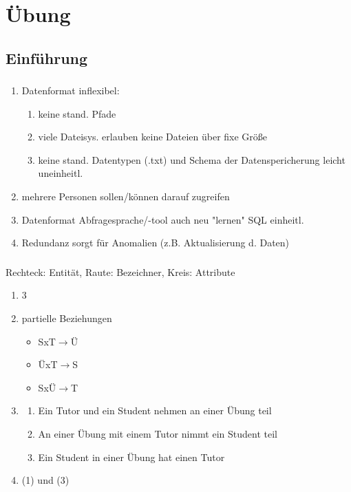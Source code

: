 
\chapter{Übung}
\section{Einführung}
\subsection{}
\begin{enumerate}
	\item Datenformat inflexibel:
	\begin{enumerate}
		\item keine stand. Pfade
		\item viele Dateisys. erlauben keine Dateien über fixe Größe
		\item keine stand. Datentypen (.txt) und Schema der Datenspericherung leicht uneinheitl.
	\end{enumerate}
	\item mehrere Personen sollen/können darauf zugreifen
	\item Datenformat Abfragesprache/-tool auch neu "lernen" SQL einheitl.
	\item Redundanz sorgt für Anomalien (z.B. Aktualisierung d. Daten)
\end{enumerate}
\subsection{}
Rechteck: Entität, Raute: Bezeichner, Kreis: Attribute
\begin{enumerate}
	\item 3
	\item partielle Beziehungen
	\begin{itemize}
		\item SxT\(\to\)Ü
		\item ÜxT\(\to\)S
		\item SxÜ\(\to\)T
	\end{itemize}
	\item
	\begin{enumerate}
		\item Ein Tutor und ein Student nehmen an einer Übung teil
		\item An einer Übung mit einem Tutor nimmt ein Student teil
		\item Ein Student in einer Übung hat einen Tutor
	\end{enumerate}
	\item (1) und (3)
\end{enumerate}
